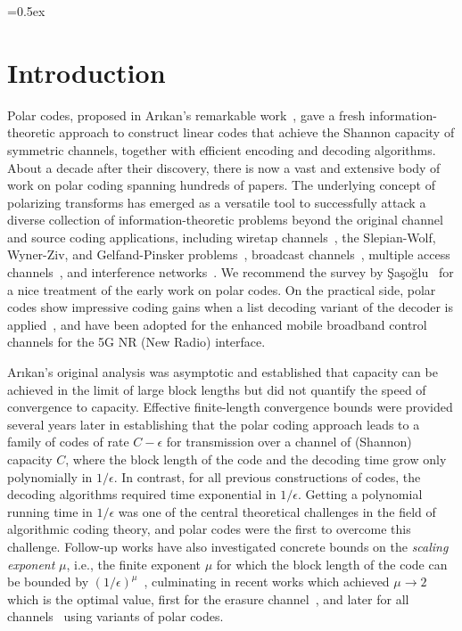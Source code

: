 \documentclass[11pt]{article}
\newcommand{\Arikan}{Ar\i kan}
\begin{document}
\begin{abstract}
\end{abstract}



\newpage
{\footnotesize 
\tableofcontents}
\thispagestyle{empty}

\thispagestyle{empty}

\newpage




\def\inappendix{1}


\parskip=0.5ex

\section{Introduction}


Polar codes, proposed in \Arikan's remarkable
work~\cite{arikan-polar}, gave a fresh information-theoretic approach
to construct linear codes that achieve the Shannon capacity of
symmetric channels, together with efficient encoding and decoding
algorithms. About a decade after their discovery, there is now a vast
and extensive body of work on polar coding spanning hundreds of
papers.  The underlying concept of polarizing transforms has emerged
as a versatile tool to successfully attack a diverse collection of
information-theoretic problems beyond the original channel and source
coding applications, including wiretap channels~\cite{MV11}, the
Slepian-Wolf, Wyner-Ziv, and Gelfand-Pinsker problems~\cite{korada},
broadcast channels~\cite{GAG13}, multiple access
channels~\cite{STY13,AT12}, and interference networks~\cite{WS14}. We
recommend the survey by \c{S}a\c{s}o\u{g}lu~\cite{sasoglu-book} for a
nice treatment of the early work on polar codes. On the practical
side, polar codes show impressive coding gains when a list
decoding variant of the decoder is applied~\cite{TV15}, and have been adopted for the enhanced mobile broadband control channels for the 5G NR (New Radio) interface.

\Arikan's original analysis was asymptotic and  established that capacity can be achieved in the limit of large block lengths but did not quantify the speed of convergence to capacity. Effective finite-length convergence bounds were provided several years later in \cite{GX15,HAU14,GV15} establishing that the polar coding approach leads to a family of codes of rate $C-\epsilon$ for transmission over a channel of (Shannon) capacity $C$, where the block length of the code and the decoding time grow only polynomially in $1/\epsilon$.
In contrast, for all previous constructions of codes, the decoding
algorithms required time exponential in $1/\epsilon$.  Getting a
polynomial running time in $1/\epsilon$ was one of the central
theoretical challenges in the field of algorithmic coding theory, and
polar codes were the first to overcome this challenge. Follow-up works
have also investigated concrete bounds on the \emph{scaling exponent}
$\mu$, i.e., the finite exponent $\mu$ for which the block length of
the code can be bounded by $(1/\epsilon)^\mu$~\cite{MHU16,GoldinB14}, culminating in recent works which achieved $\mu \to 2$ which is the optimal value, first for the erasure channel~\cite{PfisterU19,FHMV21}, and later for all channels~\cite{GRY20,WD21} using variants of polar codes.
\end{document}
